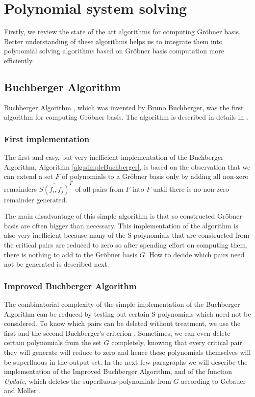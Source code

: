 \chapter{Polynomial system solving}
\label{chapter:polynomialSolving}
Firstly, we review the state of the art algorithms for computing Gr\"obner basis. Better understanding of these algorithms helps us to integrate them into polynomial solving algorithms based on Gr\"obner basis computation more efficiently.

\section{Buchberger Algorithm}
Buchberger Algorithm \cite{Buchberger65}, which was invented by Bruno Buchberger, was the first algorithm for computing Gr\"obner basis. The algorithm is described in details in \cite{Becker93, Cox-Little-Shea97}.

\subsection{First implementation}
The first and easy, but very inefficient implementation of the Buchberger Algorithm, Algorithm \ref{alg:simpleBuchberger}, is based on the observation that we can extend a set $F$ of polynomials to a Gr\"obner basis only by adding all non-zero remainders $\overline{S(f_i, f_j)}^F$ of all pairs from $F$ into $F$ until there is no non-zero remainder generated.

The main disadvantage of this simple algorithm is that so constructed Gr\"obner basis are often bigger than necessary. This implementation of the algorithm is also very inefficient because many of the S-polynomials that are constructed from the critical pairs are reduced to zero so after spending effort on computing them, there is nothing to add to the Gr\"obner basis $G$. How to decide which pairs need not be generated is described next.



\subsection{Improved Buchberger Algorithm}
\label{subsec:ImprovedBuchberger}
The combinatorial complexity of the simple implementation of the Buchberger Algorithm can be reduced by testing out certain S-polynomials which need not be considered. To know which pairs can be deleted without treatment, we use the first and the second Buchberger's criterion \cite{Becker93}. Sometimes, we can even delete certain polynomials from the set $G$ completely, knowing that every critical pair they will generate will reduce to zero and hence these polynomials themselves will be superfluous in the output set. In the next few paragraphs we will describe the implementation of the Improved Buchberger Algorithm, and of the function \textit{Update}, which deletes the superfluous polynomials from $G$ according to Gebauer and M\"oller \cite{Gebauer-Moller88}.

